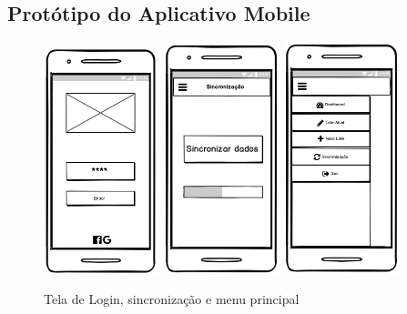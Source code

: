 
\begin{apendicesenv}
\partapendices

\chapter{Protótipo do Aplicativo Mobile} %
\label{chap:apendiceA}

\begin{figure}[h]
    \centering
    \caption{Tela de Login, sincronização e menu principal}
    \includegraphics[width=0.3\textwidth]{./dados/figuras/p1.png}
    \includegraphics[width=0.3\textwidth]{./dados/figuras/p2.png}
    \includegraphics[width=0.3\textwidth]{./dados/figuras/p3.png}
    \label{fig:p1}
\end{figure}


\end{apendicesenv}

